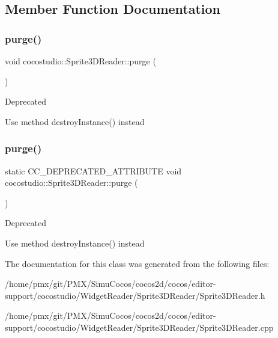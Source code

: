 \subsection{Member Function Documentation}
\mbox{\label{classcocostudio_1_1Sprite3DReader_af88a74ae016a6d393a67a314fb20d7c7}} 
\subsubsection{\texorpdfstring{purge()}{purge()}\hspace{0.1cm}{\footnotesize\ttfamily [1/2]}}
{\footnotesize\ttfamily void cocostudio\+::\+Sprite3\+D\+Reader\+::purge (\begin{DoxyParamCaption}{ }\end{DoxyParamCaption})\hspace{0.3cm}{\ttfamily [static]}}

\begin{DoxyRefDesc}{Deprecated}
\item[\hyperlink{deprecated__deprecated000105}{Deprecated}]Use method destroy\+Instance() instead \end{DoxyRefDesc}
\mbox{\label{classcocostudio_1_1Sprite3DReader_a7c1c07873821711c7dfa1acdd4f98acd}} 
\subsubsection{\texorpdfstring{purge()}{purge()}\hspace{0.1cm}{\footnotesize\ttfamily [2/2]}}
{\footnotesize\ttfamily static C\+C\+\_\+\+D\+E\+P\+R\+E\+C\+A\+T\+E\+D\+\_\+\+A\+T\+T\+R\+I\+B\+U\+TE void cocostudio\+::\+Sprite3\+D\+Reader\+::purge (\begin{DoxyParamCaption}{ }\end{DoxyParamCaption})\hspace{0.3cm}{\ttfamily [static]}}

\begin{DoxyRefDesc}{Deprecated}
\item[\hyperlink{deprecated__deprecated000340}{Deprecated}]Use method destroy\+Instance() instead \end{DoxyRefDesc}


The documentation for this class was generated from the following files\+:\begin{DoxyCompactItemize}
\item 
/home/pmx/git/\+P\+M\+X/\+Simu\+Cocos/cocos2d/cocos/editor-\/support/cocostudio/\+Widget\+Reader/\+Sprite3\+D\+Reader/Sprite3\+D\+Reader.\+h\item 
/home/pmx/git/\+P\+M\+X/\+Simu\+Cocos/cocos2d/cocos/editor-\/support/cocostudio/\+Widget\+Reader/\+Sprite3\+D\+Reader/Sprite3\+D\+Reader.\+cpp\end{DoxyCompactItemize}
